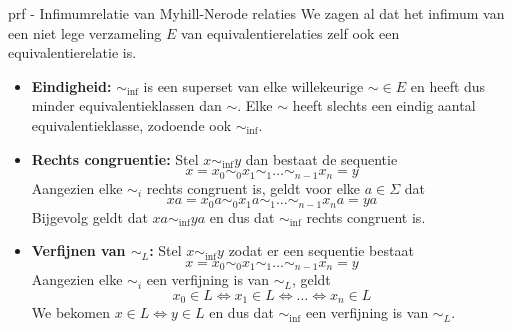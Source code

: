 \begin{prf}{prf - Infimumrelatie van Myhill-Nerode relaties}
    We zagen al dat het infimum van een niet lege verzameling $E$ van equivalentierelaties zelf ook een equivalentierelatie is.

    \begin{itemize}
        \item 
            \textbf{Eindigheid:} $\sim_{\text{inf}}$ is een superset van elke willekeurige $\sim \in E$ en heeft dus minder equivalentieklassen
            dan $\sim$. Elke $\sim$ heeft slechts een eindig aantal equivalentieklasse, zodoende ook $\sim_{\text{inf}}$.
        \item 
            \textbf{Rechts congruentie:} Stel $x \sim_{\text{inf}} y$ dan bestaat de sequentie 
            \begin{equation*}
                x = x_0 \sim_0 x_1 \sim_1 \ldots \sim_{n-1} x_n = y
            \end{equation*}
            Aangezien elke $\sim_i$ rechts congruent is, geldt voor elke $a \in \Sigma$ dat 
            \begin{equation*}
                xa = x_0a \sim_0 x_1a \sim_1 \ldots \sim_{n-1} x_na = ya
            \end{equation*}
            Bijgevolg geldt dat $xa \sim_{\text{inf}} ya$ en dus dat $\sim_{\text{inf}}$ rechts congruent is.
        \item 
            \textbf{Verfijnen van $\sim_L$:} Stel $x \sim_{\text{inf}} y$ zodat er een sequentie bestaat 
            \begin{equation*}
                x = x_0 \sim_0 x_1 \sim_1 \ldots \sim_{n-1} x_n = y
            \end{equation*}
            Aangezien elke $\sim_i$ een verfijning is van $\sim_L$, geldt
            \begin{equation*}
                x_0 \in L \Leftrightarrow x_1 \in L \Leftrightarrow \ldots \Leftrightarrow x_n \in L
            \end{equation*}
            We bekomen $x \in L \Leftrightarrow y \in L$ en dus dat $\sim_{\text{inf}}$ een verfijning is van $\sim_L$.
    \end{itemize}
\end{prf}

\newpage